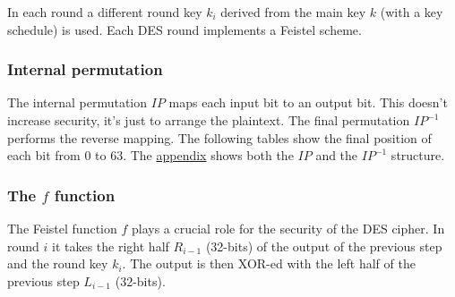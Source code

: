 \documentclass{article}
\begin{document}
  In each round a different round key $k_{i}$ derived from the main
  key $k$ (with a key schedule) is used.
  Each DES round implements a Feistel scheme.
  
  \subsubsection{Internal permutation}

  The internal permutation $IP$ maps each input bit to an output bit.
  This doesn't increase security, it's just to arrange the plaintext. 
  The final permutation $IP^{-1}$ performs the reverse mapping.
  The following tables show the final position of each bit from $0$ to 63.
  The \hyperlink{appendix}{appendix} shows both the $IP$ and the
  $IP^{-1}$ structure.

  \subsubsection{The $f$ function}

  The Feistel function $f$ plays a crucial role for the security 
  of the DES cipher. In round $i$ it takes the right half 
  $R_{i-1}$ (32-bits) of the 
  output of the previous step and the round key $k_{i}$.
  The output is then XOR-ed with the left half of the previous step
  $L_{i-1}$ (32-bits).
  
\end{document}
